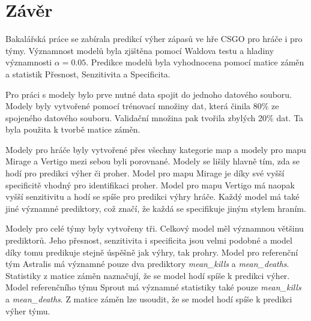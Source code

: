\chapter{Závěr}
Bakalářská práce se zabírala predikcí výher zápasů ve hře \ac{CSGO} pro hráče i pro týmy. Významnost modelů byla zjištěna pomocí Waldova testu a hladiny významnosti
$\alpha = 0.05$. Predikce modelů byla vyhodnocena pomocí matice záměn a statistik Přesnost, Senzitivita a Specificita.

Pro práci s modely bylo prve nutné data spojit do jednoho datového souboru. Modely byly vytvořené pomocí trénovací množiny dat, která činila 80\% ze 
spojeného datového souboru. Validační množina pak tvořila zbylých 20\% dat. Ta byla použita k tvorbě matice záměn.

Modely pro hráče byly vytvořené přes všechny kategorie map a modely pro mapu Mirage a Vertigo mezi sebou byli porovnané. Modely se lišily hlavně tím, zda se hodí pro 
predikci výher či proher. Model pro mapu Mirage je díky své vyšší specificitě vhodný pro identifikaci proher. Model pro mapu Vertigo má naopak vyšší senzitivitu
a hodí se spíše pro predikci výhry hráče. Každý model má také jiné významné prediktory, což značí, že každá se specifikuje jiným stylem hraním.

Modely pro celé týmy byly vytvořeny tři. Celkový model měl významnou většinu prediktorů. Jeho přesnost, senzitivita i specificita jsou velmi podobné a model díky tomu
predikuje stejně úspěšně jak výhry, tak prohry. Model pro referenční tým Astralis má významné pouze dva prediktory \textit{mean\_kills} a \textit{mean\_deaths}. Statistiky
z matice záměn naznačují, že se model hodí spíše k predikci výher. Model referenčního týmu Sprout má významné statistiky také pouze \textit{mean\_kills} a \textit{mean\_deaths}.
Z matice záměn lze usoudit, že se model hodí spíše k predikci výher týmu.